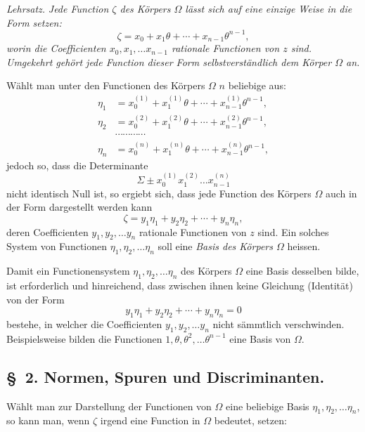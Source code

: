 \documentclass{article}
\begin{document}
\emph{Lehrsatz.} \emph{Jede Function $\zeta$ des Körpers $\Omega$ lässt sich auf eine einzige Weise in die Form setzen:}
\[ \zeta = x_{0} + x_{1}\theta + \cdots + x_{n-1}\theta^{n-1}, \]
\emph{worin die Coefficienten $x_{0}, x_{1}, \ldots x_{n-1}$ rationale Functionen von $z$ sind. Umgekehrt gehört jede Function dieser Form selbstverständlich dem Körper $\Omega$ an.}

Wählt man unter den Functionen des Körpers $\Omega$ $n$ beliebige aus:
\[ \begin{aligned} \eta_{1} &= x_{0}^{(1)} + x_{1}^{(1)}\theta + \cdots + x_{n-1}^{(1)}\theta^{n-1}, \\ \eta_{2} &= x_{0}^{(2)} + x_{1}^{(2)}\theta + \cdots + x_{n-1}^{(2)}\theta^{n-1}, \\ &\cdots\cdots\cdots\cdots \\ \eta_{n} &= x_{0}^{(n)} + x_{1}^{(n)}\theta + \cdots + x_{n-1}^{(n)}\theta^{n-1}, \end{aligned} \]
jedoch so, dass die Determinante
\[ \Sigma \pm x_{0}^{(1)} x_{1}^{(2)} \ldots x_{n-1}^{(n)} \]
nicht identisch Null ist, so ergiebt sich, dass jede Function des Körpers $\Omega$ auch in der Form dargestellt werden kann
\[ \zeta = y_{1}\eta_{1} + y_{2}\eta_{2} + \cdots + y_{n}\eta_{n}, \]
deren Coefficienten $y_{1}, y_{2}, \ldots y_{n}$ rationale Functionen von $z$ sind. Ein solches System von Functionen $\eta_{1}, \eta_{2}, \ldots \eta_{n}$ soll eine \emph{Basis des Körpers $\Omega$} heissen.

Damit ein Functionensystem $\eta_{1}, \eta_{2}, \ldots \eta_{n}$ des Körpers $\Omega$ eine Basis desselben bilde, ist erforderlich und hinreichend, dass zwischen ihnen keine Gleichung (Identität) von der Form
\[ y_{1}\eta_{1} + y_{2}\eta_{2} + \cdots + y_{n}\eta_{n} = 0 \]
bestehe, in welcher die Coefficienten $y_{1}, y_{2}, \ldots y_{n}$ nicht sämmtlich verschwinden. Beispielsweise bilden die Functionen $1, \theta, \theta^{2}, \ldots \theta^{n-1}$ eine Basis von $\Omega$.

\subsection*{§~2. Normen, Spuren und Discriminanten.}

Wählt man zur Darstellung der Functionen von $\Omega$ eine beliebige Basis $\eta_{1}, \eta_{2}, \ldots \eta_{n}$, so kann man, wenn $\zeta$ irgend eine Function in $\Omega$ bedeutet, setzen:
\end{document}
